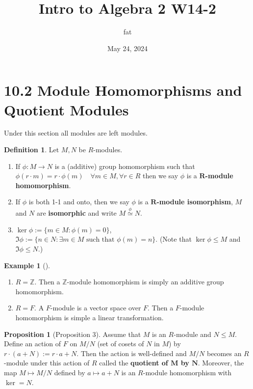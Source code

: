 \documentclass{article}
\title{Intro to Algebra 2 W14-2}
\author{fat}
\date{May 24, 2024}
\theoremstyle{definition}
\newtheorem{ex}{Example}
\newtheorem{dfn}{Definition}
\newtheorem{prop}{Proposition}
\newenvironment{exs}[1][]{%
  \begin{ex}[#1]$ $\par\nobreak\ignorespaces
}{%
  \end{ex}
}
\newcommand{\ZZ}{\mathbb Z}
\begin{document}
\maketitle
\thispagestyle{fancy}
\renewcommand{\footrulewidth}{0.4pt}
\cfoot{\thepage}
\renewcommand{\headrulewidth}{0.4pt}

\section*{10.2 Module Homomorphisms and Quotient Modules}

Under this section all modules are left modules.

\begin{dfn}
	Let $M, N$ be $R$-modules.
	\begin{enumerate}
		\item[(1)] If $\phi:M \to N$ is a (additive) group homomorphism such that $\phi(r \cdot m) = r \cdot \phi(m) \quad \forall m \in M, \forall r \in R$ then we say $\phi$ is a \textbf{$\bm{R}$-module homomorphism}.

		\item[(2)] If $\phi$ is both 1-1 and onto, then we say $\phi$ is a \textbf{$\bm{R}$-module isomorphism}, $M$ and $N$ are \textbf{isomorphic} and write $M \stackrel{\phi}{\simeq} N$.

		\item[(3)] $\ker \phi := \{m \in M: \phi(m) = 0\}$, $\Im \phi := \{n \in N: \exists m \in M \text{ such that } \phi(m) = n\}$.
			(Note that $\ker \phi \leq M$ and $\Im \phi \leq N$.)
	\end{enumerate}
\end{dfn}

\begin{exs}
	\begin{enumerate}
		\item[(1)] $R = \ZZ$.
			Then a $\ZZ$-module homomorphism is simply an additive group homomorphism.

		\item[(2)] $R = F$.
			A $F$-module is a vector space over $F$.
			Then a $F$-module homomorphism is simple a linear transformation.

	\end{enumerate}
\end{exs}

\begin{prop}[Proposition 3]
	Assume that $M$ is an $R$-module and $N \leq M$.
	Define an action of $F$ on $M/N$ (set of cosets of $N$ in $M$) by $r \cdot (a + N) := r \cdot a + N$.
	Then the action is well-defined and $M/N$ becomes an $R$-module under this action of $R$ called the \textbf{quotient of $\bm{M}$ by $\bm{N}$}.
	Moreover, the map $M \mapsto M/N$ defined by $a \mapsto a + N$ is an $R$-module homomorphism with $\ker = N$.
\end{prop}
\end{document}

